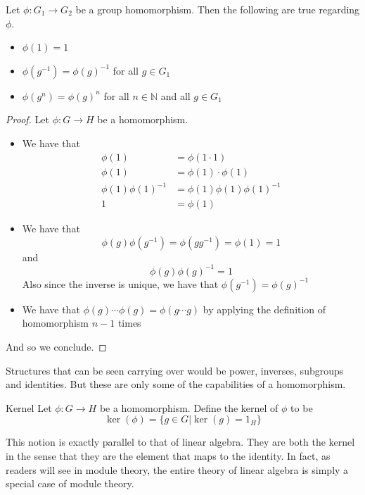 \documentclass[a4paper]{article}
\begin{document}
\begin{prp}{}{} Let $\phi:G_1\to G_2$ be a group homomorphism. Then the following are true regarding $\phi$. 
\begin{itemize}
\item $\phi(1)=1$
\item $\phi(g^{-1})=\phi(g)^{-1}$ for all $g\in G_1$
\item $\phi(g^n)=\phi(g)^n$ for all $n\in\mathbb{N}$ and all $g\in G_1$
\end{itemize}\tcbline
\begin{proof} Let $\phi:G\to H$ be a homomorphism. 
\begin{itemize}
\item We have that 
\begin{align*}
\phi(1)&=\phi(1\cdot 1)\\
\phi(1)&=\phi(1)\cdot\phi(1)\\
\phi(1)\phi(1)^{-1}&=\phi(1)\phi(1)\phi(1)^{-1}\\
1&=\phi(1)
\end{align*}
\item We have that $$\phi(g)\phi(g^{-1})=\phi(gg^{-1})=\phi(1)=1$$ and $$\phi(g)\phi(g)^{-1}=1$$ Also since the inverse is unique, we have that $\phi(g^{-1})=\phi(g)^{-1}$
\item We have that $\phi(g)\cdots\phi(g)=\phi(g\cdots g)$ by applying the definition of homomorphism $n-1$ times
\end{itemize}
And so we conclude. 
\end{proof}
\end{prp}

Structures that can be seen carrying over would be power, inverses, subgroups and identities. But these are only some of the capabilities of a homomorphism. 

\begin{defn}{Kernel}{} Let $\phi:G\to H$ be a homomorphism. Define the kernel of $\phi$ to be $$\ker(\phi)=\{g\in G|\ker(g)=1_H\}$$
\end{defn}

This notion is exactly parallel to that of linear algebra. They are both the kernel in the sense that they are the element that maps to the identity. In fact, as readers will see in module theory, the entire theory of linear algebra is simply a special case of module theory. 
\end{document}
